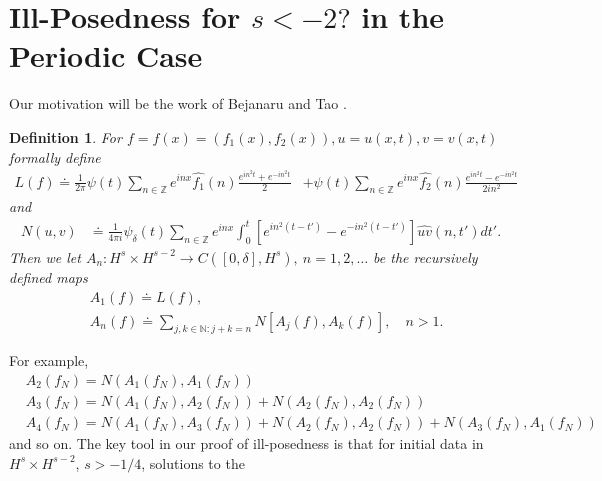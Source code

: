 \documentclass[12pt,reqno]{amsart}
\numberwithin{equation}{section}  %
\newcommand{\zz}{\mathbb{Z}}
\newcommand{\wh}{\widehat}
\newtheorem{definition}[theorem]{Definition}
\begin{document}
\section{Ill-Posedness for $s < -2 ?$ in the Periodic Case}
Our motivation will be the work of Bejanaru and Tao
\cite{Bejenaru-Tao-2006-Sharp-well-posedness-and-ill-posedness}. 
%
\begin{definition}
  For $f =f(x)= (f_{1}(x), f_{2}(x)), u = u(x,t), v = v(x,t)$ formally define 
%
%
\begin{equation*}
\begin{split}
  L(f)
  \doteq \frac{1}{2 \pi} \psi(t) \sum_{n \in \zz} e^{inx}
  \wh{f_{1}}(n) \frac{e^{in^{2}t} + e^{-in^{2}t}}{2} 
  & + \psi(t) \sum_{n \in \zz} e^{inx}
  \wh{f_{2}}(n)\frac{e^{in^{2}t} - e^{-in^{2}t}}{2 i n^{2}} 
\end{split}
\end{equation*}
%
%
and
%
%
\begin{equation*}
\begin{split}
N(u, v)
& \doteq \frac{1}{4 \pi i} \psi_{\delta}(t) \sum_{n \in \zz} e^{inx}
    \int_{0}^{t}[e^{in^{2}(t-t')}-e^{-in^{2}(t-t')}]
    \wh{uv}(n, t') dt'.
\end{split}
\end{equation*}
%
%
Then we let $A_{n}: H^{s} \times H^{s-2} \to C([0, \delta], H^{s}), \ n = 1, 2, \dots$ be the
recursively defined maps
%
%
\begin{equation*}
\begin{split}
  & A_{1}(f) \doteq L(f),
  \\
  & A_{n}(f) \doteq \sum_{j, k \in \mathbb{N}: j + k = n} N\left[
  A_{j}(f), A_{k}(f) \right], \quad n > 1.
\end{split}
\end{equation*}
\end{definition}
%
%
%
For example, 
%
%
\begin{equation*}
\begin{split}
  & A_{2}(f_{N}) = N(A_{1}(f_{N}), A_{1}(f_{N}))
  \\
  & A_{3}(f_{N}) = N(A_{1}(f_{N}), A_{2}(f_{N})) + N(A_{2}(f_{N}), A_{2}(f_{N}))
  \\
  & A_{4}(f_{N})= N(A_{1}(f_{N}), A_{3}(f_{N})) + N(A_{2}(f_{N}), A_{2}(f_{N}))
  + N(A_{3}(f_{N}), A_{1}(f_{N}))
\end{split}
\end{equation*}
%
%
and so on. The key tool in our proof of ill-posedness is that for initial data
in $H^{s} \times H^{s-2}$, $s > -1/4$, solutions to the
\end{document}
